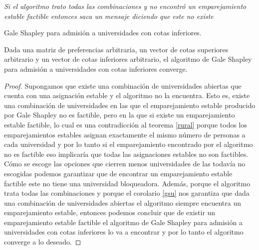 \IncMargin{1em}
\begin{Algoritmo}[H]

\BlankLine
{}
	\emph{Si el algoritmo trato todas las combinaciones y no encontró un emparejamiento estable factible entonces saca un mensaje diciendo que este no existe\;}
\caption{Gale Shapley  para admisión a universidades con cotas inferiores.}
\end{Algoritmo}
\DecMargin{1em}

\begin{cor}
Dada una matriz de preferencias arbitraria, un vector de cotas superiores arbitrario y un vector de cotas inferiores arbitrario, el algoritmo de Gale Shapley para admisión a universidades con cotas inferiores converge.
\end{cor}
\begin{proof}
Supongamos que existe una combinación de universidades abiertas que cuenta con una asignación estable y el algoritmo no la encuentra. Esto es, existe una combinación de universidades en las que el emparejamiento estable producido por Gale Shapley no es factible, pero en la que si existe un emparejamiento estable factible, lo cual es una contradicción al teorema \ref{rural} porque todos los emparejamientos estables asignan exactamente el mismo número de personas a cada universidad y por lo tanto si el emparejamiento encontrado por el algoritmo no es factible eso implicaría que todas las asignaciones estables no son factibles. \\
Cómo se escoge las opciones que cierren menos universidades de las todavía no escogidas podemos garantizar que de encontrar un emparejamiento estable factible este no tiene una universidad bloqueadora. 
Además, porque el algoritmo trata todas las combinaciones y porque el corolario \ref{gsu} nos garantiza que dada una combinación de universidades abiertas el algoritmo siempre encuentra un emparejamiento estable, entonces podemos concluir que de existir un emparejamiento estable factible el algoritmo de Gale Shapley para admisión a universidades con cotas inferiores lo va a encontrar y por lo tanto el algoritmo converge a lo deseado. 
\end{proof}

